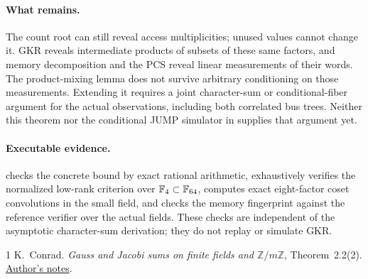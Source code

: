 \documentclass[11pt]{article}
\begin{document}
\paragraph{What remains.} The count root can still reveal access multiplicities; unused values cannot change it. GKR reveals intermediate products of subsets of these same factors, and memory decomposition and the PCS reveal linear measurements of their words. The product-mixing lemma does not survive arbitrary conditioning on those measurements. Extending it requires a joint character-sum or conditional-fiber argument for the actual observations, including both correlated bus trees. Neither this theorem nor the conditional JUMP simulator in  supplies that argument yet.

\paragraph{Executable evidence.}  checks the concrete bound by exact rational arithmetic, exhaustively verifies the normalized low-rank criterion over $\mathbb{F}_4\subset\mathbb{F}_{64}$, computes exact eight-factor coset convolutions in the small field, and checks the memory fingerprint against the reference verifier over the actual fields. These checks are independent of the asymptotic character-sum derivation; they do not replay or simulate GKR.

\begin{thebibliography}{1}
 K.~Conrad. \emph{Gauss and Jacobi sums on finite fields and $\mathbb Z/m\mathbb Z$}, Theorem~2.2(2). \href{https://kconrad.math.uconn.edu/blurbs/gradnumthy/Gauss-Jacobi-sums.pdf}{Author's notes}.
\end{thebibliography}
\end{document}

